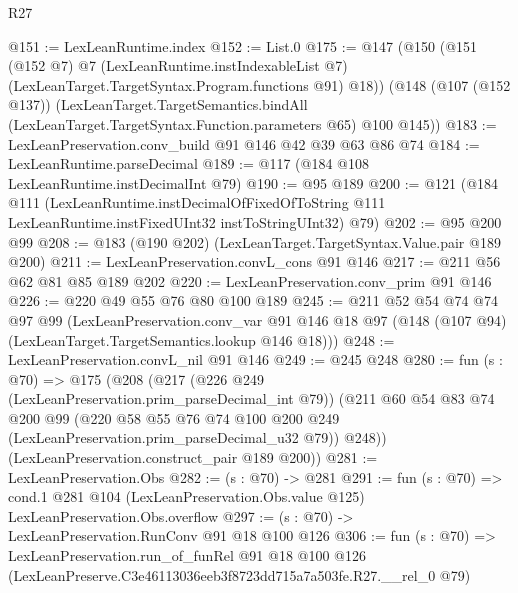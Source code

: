 \begin{lexlean}{R27}
\begin{coremodule}
@151 := LexLeanRuntime.index
@152 := List.{0}
@175 := @147
    (@150
      (@151
        (@152 @7)
        @7
        (LexLeanRuntime.instIndexableList @7)
        (LexLeanTarget.TargetSyntax.Program.functions @91)
        @18))
    (@148
      (@107 (@152 @137))
      (LexLeanTarget.TargetSemantics.bindAll
        (LexLeanTarget.TargetSyntax.Function.parameters @65)
        @100
        @145))
@183 := LexLeanPreservation.conv_build @91 @146 @42 @39 @63 @86 @74
@184 := LexLeanRuntime.parseDecimal
@189 := @117 (@184 @108 LexLeanRuntime.instDecimalInt @79)
@190 := @95 @189
@200 := @121
    (@184
      @111
      (LexLeanRuntime.instDecimalOfFixedOfToString
        @111
        LexLeanRuntime.instFixedUInt32
        instToStringUInt32)
      @79)
@202 := @95 @200 @99
@208 := @183 (@190 @202) (LexLeanTarget.TargetSyntax.Value.pair @189 @200)
@211 := LexLeanPreservation.convL_cons @91 @146
@217 := @211 @56 @62 @81 @85 @189 @202
@220 := LexLeanPreservation.conv_prim @91 @146
@226 := @220 @49 @55 @76 @80 @100 @189
@245 := @211
    @52
    @54
    @74
    @74
    @97
    @99
    (LexLeanPreservation.conv_var
      @91
      @146
      @18
      @97
      (@148 (@107 @94) (LexLeanTarget.TargetSemantics.lookup @146 @18)))
@248 := LexLeanPreservation.convL_nil @91 @146
@249 := @245 @248
@280 := fun (s : @70) =>
  @175
    (@208
      (@217
        (@226 @249 (LexLeanPreservation.prim_parseDecimal_int @79))
        (@211
          @60
          @54
          @83
          @74
          @200
          @99
          (@220 @58 @55 @76 @74 @100 @200 @249 (LexLeanPreservation.prim_parseDecimal_u32 @79))
          @248))
      (LexLeanPreservation.construct_pair @189 @200))
@281 := LexLeanPreservation.Obs
@282 := (s : @70) -> @281
@291 := fun (s : @70) =>
  cond.{1} @281 @104 (LexLeanPreservation.Obs.value @125) LexLeanPreservation.Obs.overflow
@297 := (s : @70) -> LexLeanPreservation.RunConv @91 @18 @100 @126
@306 := fun (s : @70) =>
  LexLeanPreservation.run_of_funRel
    @91
    @18
    @100
    @126
    (LexLeanPreserve.C3e46113036eeb3f8723dd715a7a503fe.R27.__rel_0 @79)
\end{coremodule}
\end{lexlean}
